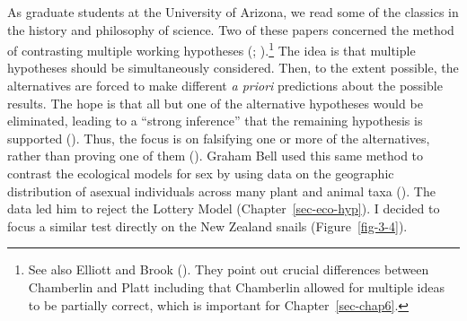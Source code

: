 \documentclass[
  letterpaper,
]{book}
\begin{document}
As graduate students at the University of Arizona, we read some of the
classics in the history and philosophy of science. Two of these papers
concerned the method of contrasting multiple working hypotheses
(;
).\footnote{See also Elliott and
  Brook (). They point out crucial
  differences between Chamberlin and Platt including that Chamberlin
  allowed for multiple ideas to be partially correct, which is important
  for Chapter~\ref{sec-chap6}.} The idea is that multiple hypotheses
should be simultaneously considered. Then, to the extent possible, the
alternatives are forced to make different \emph{a priori} predictions
about the possible results. The hope is that all but one of the
alternative hypotheses would be eliminated, leading to a ``strong
inference'' that the remaining hypothesis is supported
(). Thus, the focus is on
falsifying one or more of the alternatives, rather than proving one of
them (). Graham Bell used this
same method to contrast the ecological models for sex by using data on
the geographic distribution of asexual individuals across many plant and
animal taxa (). The data led him to
reject the Lottery Model (Chapter~\ref{sec-eco-hyp}). I decided to focus
a similar test directly on the New Zealand snails
(Figure~\ref{fig-3-4}).
\end{document}
